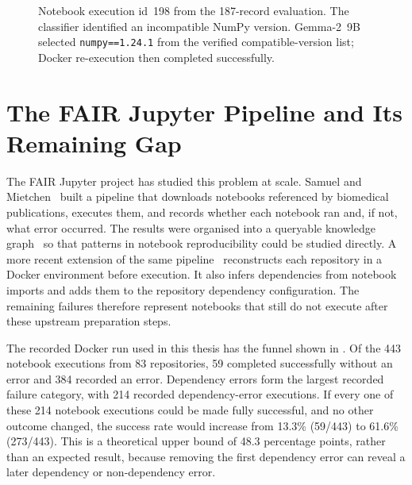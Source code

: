 \begin{figure}[htbp]
  \caption{Notebook execution id~198 from the 187-record evaluation. The
  classifier identified an incompatible NumPy version. Gemma-2~9B selected
  \texttt{numpy==1.24.1} from the verified compatible-version list; Docker
  re-execution then completed successfully.}
  \label{fig:intro-repair-example}
\end{figure}

\section{The FAIR Jupyter Pipeline and Its Remaining Gap}
\label{sec:intro-gap}

The FAIR Jupyter project has studied this problem at scale. Samuel and
Mietchen~\cite{samuel2024gigascience} built a pipeline that downloads
notebooks referenced by biomedical publications, executes them, and records
whether each notebook ran and, if not, what error occurred. The results were
organised into a queryable knowledge graph~\cite{samuel2024fairkg} so that
patterns in notebook reproducibility could be studied directly. A more recent
extension of the same pipeline~\cite{samuel2025docker} reconstructs each
repository in a Docker environment before execution. It also infers
dependencies from notebook imports and adds them to the repository dependency
configuration. The remaining failures therefore represent notebooks that
still do not execute after these upstream preparation steps.

The recorded Docker run used in this thesis has the funnel shown in
. Of the 443 notebook executions from 83
repositories, 59 completed successfully without an error and 384 recorded
an error. Dependency errors form the largest recorded failure category, with
214 recorded dependency-error executions. If every one of these 214 notebook
executions could be made fully
successful, and no other outcome changed, the success rate would increase
from 13.3\% (59/443) to 61.6\% (273/443). This is a theoretical upper
bound of 48.3 percentage points, rather than an expected result, because
removing the first dependency error can reveal a later dependency or
non-dependency error.

